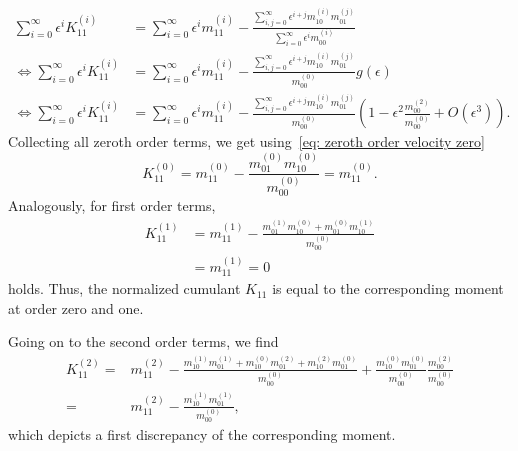 \begin{equation}
  \begin{aligned}
    \sum_{i=0}^\infty \epsilon^i K_{11}^{(i)}
    & = \sum_{i=0}^\infty \epsilon^i m_{11}^{(i)} -
    \frac{\sum_{i,j=0}^\infty \epsilon^{i+j} m_{10}^{(i)}m_{01}^{(j)}}
        {\sum_{i=0}^\infty \epsilon^i m_{00}^{(i)}} \\
    \Leftrightarrow
    \sum_{i=0}^\infty \epsilon^i K_{11}^{(i)}
    & = \sum_{i=0}^\infty \epsilon^i m_{11}^{(i)} -
    \frac{\sum_{i,j=0}^\infty \epsilon^{i+j} m_{10}^{(i)}m_{01}^{(j)}}
    {m_{00}^{(0)}}
    g(\epsilon)\\
    \Leftrightarrow
  \sum_{i=0}^\infty \epsilon^i K_{11}^{(i)}
   & = \sum_{i=0}^\infty \epsilon^i m_{11}^{(i)} -
  \frac{\sum_{i,j=0}^\infty \epsilon^{i+j} m_{10}^{(i)}m_{01}^{(j)}}
      {m_{00}^{(0)}}
  \left(1 - \epsilon^2 \frac{m_{00}^{(2)}}{m_{00}^{(0)}}  + O(\epsilon^3)\right).
\end{aligned}
\end{equation}
Collecting all zeroth order terms, we get using~\eqref{eq: zeroth order velocity zero}
\begin{equation}
  K_{11}^{(0)} = m_{11}^{(0)} - \frac{m_{01}^{(0)}m_{10}^{(0)}}{m_{00}^{(0)}} =  m_{11}^{(0)}.
\end{equation}
Analogously, for first order terms,
\begin{equation}
  \begin{aligned}
    K_{11}^{(1)} & = m_{11}^{(1)} - \frac{m_{01}^{(1)}m_{10}^{(0)}+m_{01}^{(0)}m_{10}^{(1)}}{m_{00}^{(0)}}
    \\
    &= m_{11}^{(1)} = 0
  \end{aligned}
\end{equation}
holds.
Thus, the normalized cumulant $K_{11}$ is equal to the corresponding moment at order zero and one.

Going on to the second order terms, we find
\begin{equation}
  \begin{aligned}
    K_{11}^{(2)}
    = &m_{11}^{(2)}
    - \frac{
      m_{10}^{(1)}m_{01}^{(1)}
    + m_{10}^{(0)}m_{01}^{(2)}
    + m_{10}^{(2)}m_{01}^{(0)}
    }{m_{00}^{(0)}}
    + \frac{m_{10}^{(0)}m_{01}^{(0)}}{m_{00}^{(0)}}
    \frac{m_{00}^{(2)}}{{m_{00}^{(0)}}}
    \\ = &
    m_{11}^{(2)}
    - \frac{ m_{10}^{(1)}m_{01}^{(1)}}{m_{00}^{(0)}},
  \end{aligned}
\end{equation}
which depicts a first discrepancy of the corresponding moment.

